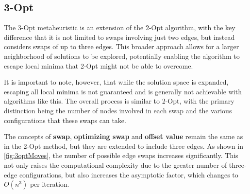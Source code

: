 

\subsection{3-Opt}

The 3-Opt metaheuristic is an extension of the 2-Opt algorithm, with the key difference that it is not limited to swaps involving just two edges, but instead considers swaps of up to three edges. This broader approach allows for a larger neighborhood of solutions to be explored, potentially enabling the algorithm to escape local minima that 2-Opt might not be able to overcome.

It is important to note, however, that while the solution space is expanded, escaping all local minima is not guaranteed and is generally not achievable with algorithms like this. The overall process is similar to 2-Opt, with the primary distinction being the number of nodes involved in each swap and the various configurations that these swaps can take.

The concepts of \textbf{swap}, \textbf{optimizing swap} and \textbf{offset value} remain the same as in the 2-Opt method, but they are extended to include three edges.
As shown in \figurename{ \ref{fig:3optMoves}}, the number of possible edge swaps increases significantly.
This not only raises the computational complexity due to the greater number of three-edge configurations, but also increases the asymptotic factor, which changes to $O(n^3)$ per iteration.

